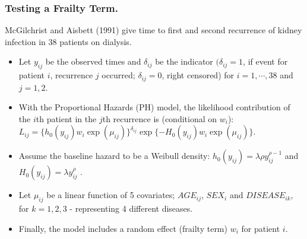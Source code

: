 \documentclass{beamer}
\begin{document}
 \frame
{
 \frametitle{ Testing a Frailty Term.}
 
McGilchrist and Aisbett (1991)
 give time to first and second 
 recurrence of kidney infection 
 in 38 patients on dialysis.
 \begin{itemize}
 \item Let $y_{ij}$ be the observed times 
and $\delta_{ij}$ be the indicator
$(\delta_{ij}=1$, if event for patient $i$, 
 recurrence $j$ occurred;   
$\delta_{ij}=0$, right censored)
 for $i=1,\cdots, 38$
and $j=1,2$.
\item
 With the Proportional Hazards (PH) model, the 
likelihood contribution 
of the $i$th patient in 
the $j$th recurrence  is (conditional 
on $w_i$): \\
$L_{ij}=\{h_0(y_{ij})w_i
\exp{(\mu_{ij})}\}^{\delta_{ij}}
\exp\{-H_0(y_{ij})w_i\exp{(\mu_{ij})}\}. $
\item Assume the baseline hazard to be 
a Weibull density:
$h_0(y_{ij})=\lambda \rho y_{ij}^{\rho-1}$ 
and $H_0(y_{ij})=\lambda 
y_{ij}^\rho$ .
\item Let
$\mu_{ij}$ be a linear function of 5 covariates;  
$AGE_{ij}$, 
$SEX_{i}$ and
$DISEASE_{ik}$, for $k=1,2,3$ - 
 representing 
4 different 
diseases. 
\item
Finally, the model includes a random effect (frailty term)
 $w_i$ for 
 patient $i$.
 \end{itemize}

}
\end{document}
